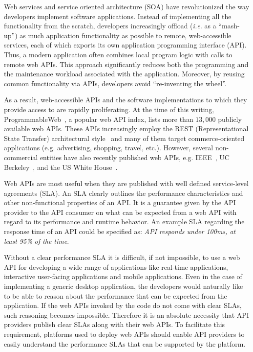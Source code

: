 Web services and service oriented architecture (SOA) have
revolutionized the way developers implement software applications.
Instead of implementing all the functionality from the scratch, developers
increasingly offload ({\em i.e.} as a ``mash-up'') as much application functionality 
as possible to remote,
web-accessible services, each of which exports its own application programming
interface (API). Thus, a modern application often combines local program logic
with calls to remote web APIs.
This approach significantly reduces both the programming and
the maintenance workload associated with the application.
Moreover, by reusing common functionality via APIs, developers avoid ``re-inventing the
wheel''.

As a result, web-accessible APIs and the software implementations to which
they provide access to are rapidly proliferating.
At the time of this writing, 
ProgrammableWeb~\cite{pweb}, a popular web API index, lists more than $13,000$
publicly available web APIs.
These APIs increasingly employ the REST (Representational State Transfer) architectural style~\cite{Fielding:2000:ASD:932295} and 
many of them target commerce-oriented applications (e.g. advertising, shopping, travel, etc.).
However, several non-commercial entities have also recently published web 
APIs, e.g. IEEE~\cite{ieeeapis}, UC Berkeley~\cite{ucbapis}, and the US White
House~\cite{whitehouseapis}. 

Web APIs are most useful when they are published with well defined service-level agreements (SLA). 
An SLA clearly outlines the performance characteristics and other non-functional 
properties of an API. It is a guarantee given by the API provider to the API consumer on what can be
expected from a web API with regard to its performance and runtime behavior. An example SLA regarding
the response time of an API could be specified as: \textit{API responds under 100ms, at least 95\% of the time}.

Without a clear performance SLA it is difficult, if not impossible,
to use a web API for developing a wide range of applications like real-time applications, interactive
user-facing applications and mobile applications. Even in the case of implementing a generic desktop
application, the developers would naturally like to be able to reason about
the performance that can be expected from the application. If the web APIs invoked by the code do
not come with clear SLAs, such reasoning becomes impossible. Therefore it is an absolute
necessity that API providers publish clear SLAs along with their web APIs. To
facilitate this requirement, platforms used to deploy web APIs should enable API providers to 
easily understand the performance SLAs that can be supported by the platform.


